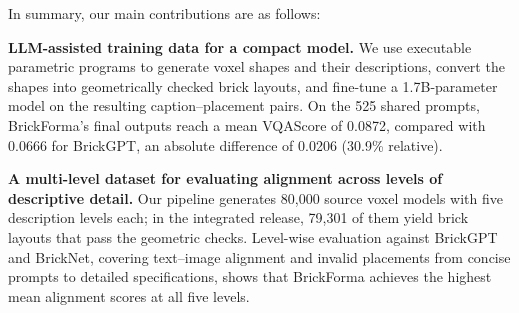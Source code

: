 In summary, our main contributions are as follows:

\textbf{LLM-assisted training data for a compact model.}
We use executable parametric programs to generate voxel shapes and their descriptions, convert the shapes into geometrically checked brick layouts, and fine-tune a 1.7B-parameter model on the resulting caption--placement pairs. On the 525 shared prompts, BrickForma's final outputs reach a mean VQAScore of 0.0872, compared with 0.0666 for BrickGPT, an absolute difference of 0.0206 (30.9\% relative).

\textbf{A multi-level dataset for evaluating alignment across levels of descriptive detail.}
Our pipeline generates 80,000 source voxel models with five description levels each; in the integrated release, 79,301 of them yield brick layouts that pass the geometric checks. Level-wise evaluation against BrickGPT and BrickNet, covering text--image alignment and invalid placements from concise prompts to detailed specifications, shows that BrickForma achieves the highest mean alignment scores at all five levels.
